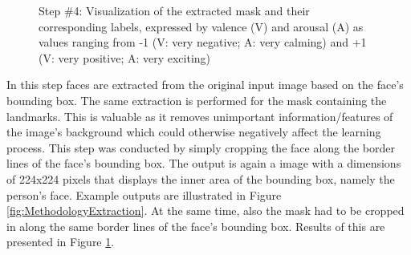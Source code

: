 \begin{figure}[H]
  \hfill
  \caption[ER pipeline step \#4: Mask extraction]{Step \#4: Visualization of the extracted mask and their corresponding labels, expressed by valence (V) and arousal (A) as values ranging from -1 (V: very negative; A: very calming) and +1 (V: very positive; A: very exciting)}
  \label{fig:MethodologyExtractionMask}
\end{figure}

In this step faces are extracted from the original input image based on the face's bounding box. The same extraction is performed for the mask containing the landmarks. This is valuable as it removes unimportant information/features of the image's background which could otherwise negatively affect the learning process.
\newline\newline
This step was conducted by simply cropping the face along the border lines of the face's bounding box. The output is again a image with a dimensions of 224x224 pixels that displays the inner area of the bounding box, namely the person's face. Example outputs are illustrated in Figure \ref{fig:MethodologyExtraction}. At the same time, also the mask had to be cropped in along the same border lines of the face's bounding box. Results of this are presented in Figure \ref{fig:MethodologyExtractionMask}.


